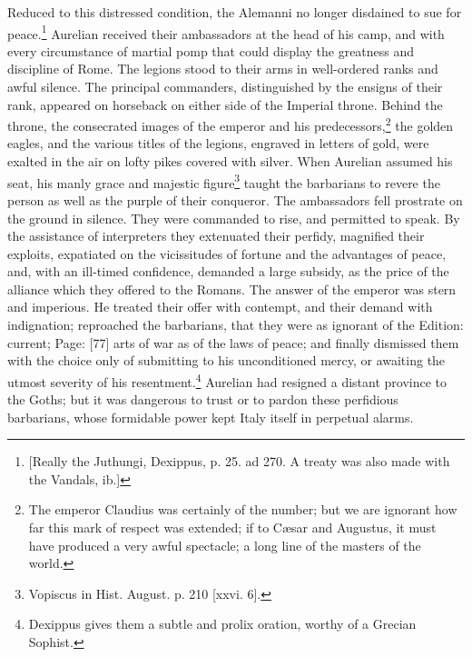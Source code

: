 Reduced to this distressed condition, the Alemanni no longer disdained to sue for peace.\footnote{[Really the Juthungi, Dexippus, p. 25. ad 270. A treaty was also made with the Vandals, ib.]} Aurelian received their ambassadors at the head of his camp, and with every circumstance of martial pomp that could display the greatness and discipline of Rome. The legions stood to their arms in well-ordered ranks and awful silence. The principal commanders, distinguished by the ensigns of their rank, appeared on horseback on either side of the Imperial throne. Behind the throne, the consecrated images of the emperor and his predecessors,\footnote{The emperor Claudius was certainly of the number; but we are ignorant how far this mark of respect was extended; if to Cæsar and Augustus, it must have produced a very awful spectacle; a long line of the masters of the world.} the golden eagles, and the various titles of the legions, engraved in letters of gold, were exalted in the air on lofty pikes covered with silver. When Aurelian assumed his seat, his manly grace and majestic figure\footnote{Vopiscus in Hist. August. p. 210 [xxvi. 6].} taught the barbarians to revere the person as well as the purple of their conqueror. The ambassadors fell prostrate on the ground in silence. They were commanded to rise, and permitted to speak. By the assistance of interpreters they extenuated their perfidy, magnified their exploits, expatiated on the vicissitudes of fortune and the advantages of peace, and, with an ill-timed confidence, demanded a large subsidy, as the price of the alliance which they offered to the Romans. The answer of the emperor was stern and imperious. He treated their offer with contempt, and their demand with indignation; reproached the barbarians, that they were as ignorant of the Edition: current; Page: [77] arts of war as of the laws of peace; and finally dismissed them with the choice only of submitting to his unconditioned mercy, or awaiting the utmost severity of his resentment.\footnote{Dexippus gives them a subtle and prolix oration, worthy of a Grecian Sophist.} Aurelian had resigned a distant province to the Goths; but it was dangerous to trust or to pardon these perfidious barbarians, whose formidable power kept Italy itself in perpetual alarms.


